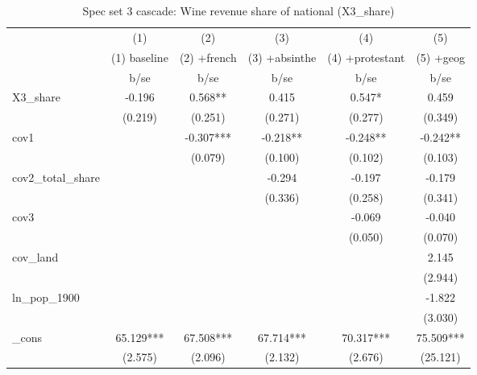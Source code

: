 \begin{table}[htbp]\centering
\def\sym#1{\ifmmode^{#1}\else\(^{#1}\)\fi}
\caption{Spec set 3 cascade: Wine revenue share of national (X3\_share) \label{tab:cascade3}}
\begin{tabular}{l*{5}{c}}
\toprule
            &\multicolumn{1}{c}{(1)}&\multicolumn{1}{c}{(2)}&\multicolumn{1}{c}{(3)}&\multicolumn{1}{c}{(4)}&\multicolumn{1}{c}{(5)}\\
            &\multicolumn{1}{c}{(1) baseline}&\multicolumn{1}{c}{(2) +french}&\multicolumn{1}{c}{(3) +absinthe}&\multicolumn{1}{c}{(4) +protestant}&\multicolumn{1}{c}{(5) +geog}\\
            &        b/se   &        b/se   &        b/se   &        b/se   &        b/se   \\
\midrule
X3\_share    &      -0.196   &       0.568** &       0.415   &       0.547*  &       0.459   \\
            &     (0.219)   &     (0.251)   &     (0.271)   &     (0.277)   &     (0.349)   \\
cov1        &               &      -0.307***&      -0.218** &      -0.248** &      -0.242** \\
            &               &     (0.079)   &     (0.100)   &     (0.102)   &     (0.103)   \\
cov2\_total\_share&               &               &      -0.294   &      -0.197   &      -0.179   \\
            &               &               &     (0.336)   &     (0.258)   &     (0.341)   \\
cov3        &               &               &               &      -0.069   &      -0.040   \\
            &               &               &               &     (0.050)   &     (0.070)   \\
cov\_land    &               &               &               &               &       2.145   \\
            &               &               &               &               &     (2.944)   \\
ln\_pop\_1900 &               &               &               &               &      -1.822   \\
            &               &               &               &               &     (3.030)   \\
\_cons      &      65.129***&      67.508***&      67.714***&      70.317***&      75.509***\\
            &     (2.575)   &     (2.096)   &     (2.132)   &     (2.676)   &    (25.121)   \\

\end{tabular}
\end{table}
